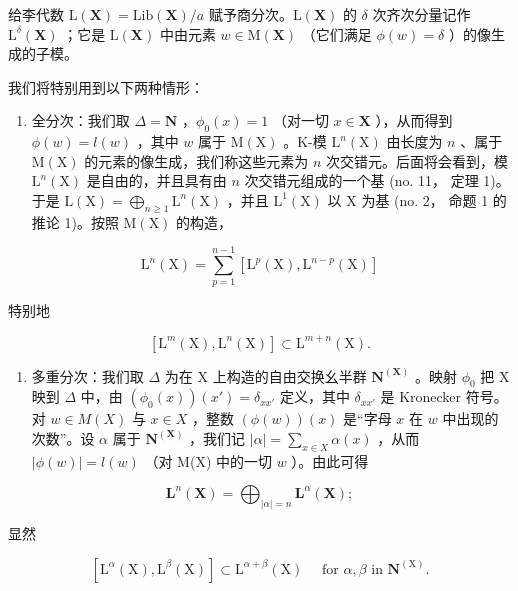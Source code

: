 给李代数 \(\mathrm{L}(\mathbf{X}) = \mathrm{Lib}(\mathbf{X}) / a\) 赋予商分次。\(\mathrm{L}(\mathbf{X})\) 的 \(\delta\) 次齐次分量记作 \(\mathrm{L}^{\delta}(\mathbf{X})\) ；它是 \(\mathrm{L}(\mathbf{X})\) 中由元素 \(w \in \mathrm{M}(\mathbf{X})\) （它们满足 \(\phi(w) = \delta\) ）的像生成的子模。

我们将特别用到以下两种情形：

\begin{enumerate}
\def\labelenumi{(\alph{enumi})}
\tightlist
\item
  全分次：我们取 \(\Delta = \mathbf{N}\) ，\(\phi_0(x) = 1\) （对一切 \(x\in \mathbf{X}\) ），从而得到 \(\phi (w) = l(w)\) ，其中 \(w\) 属于 \(\mathrm{M}(\mathrm{X})\) 。K-模 \(\mathrm{L}^n (\mathrm{X})\) 由长度为 \(n\) 、属于 \(\mathrm{M}(\mathrm{X})\) 的元素的像生成，我们称这些元素为 \(n\) 次交错元。后面将会看到，模 \(\mathrm{L}^n (\mathrm{X})\) 是自由的，并且具有由 \(n\) 次交错元组成的一个基 (no. 11， 定理 1)。于是 \(\mathrm{L}(\mathrm{X}) = \bigoplus_{n\geq 1}\mathrm{L}^n (\mathrm{X})\) ，并且 \(\mathrm{L}^1 (\mathrm{X})\) 以 X 为基 (no. 2， 命题 1 的推论 1)。按照 \(\mathrm{M}(\mathrm{X})\) 的构造，
\end{enumerate}

\[
\mathrm{L} ^ {n} (\mathrm{X}) = \sum_ {p = 1} ^ {n - 1} [ \mathrm{L} ^ {p} (\mathrm{X}), \mathrm{L} ^ {n - p} (\mathrm{X}) ]\tag{12}
\]

特别地

\[
[ \mathrm{L} ^ {m} (\mathrm{X}), \mathrm{L} ^ {n} (\mathrm{X}) ] \subset \mathrm{L} ^ {m + n} (\mathrm{X}).\tag{13}
\]

\begin{enumerate}
\def\labelenumi{(\alph{enumi})}
\setcounter{enumi}{1}
\tightlist
\item
  多重分次：我们取 \(\Delta\) 为在 X 上构造的自由交换幺半群 \(\mathbf{N}^{(\mathbf{X})}\) 。映射 \(\phi_0\) 把 X 映到 \(\Delta\) 中，由 \((\phi_0(x))(x') = \delta_{xx'}\) 定义，其中 \(\delta_{xx'}\) 是 Kronecker 符号。对 \(w \in M(X)\) 与 \(x \in X\) ，整数 \((\phi(w))(x)\) 是“字母 \(x\) 在 \(w\) 中出现的次数”。设 \(\alpha\) 属于 \(\mathbf{N}^{(\mathbf{X})}\) ，我们记 \(|\alpha| = \sum_{x \in X} \alpha(x)\) ，从而 \(|\phi(w)| = l(w)\) （对 M(X) 中的一切 \(w\) ）。由此可得
\end{enumerate}

\[
\mathbf {L} ^ {n} (\mathbf {X}) = \bigoplus_ {| \alpha | = n} \mathbf {L} ^ {\alpha} (\mathbf {X});\tag{14}
\]

显然

\[
[ \mathrm{L} ^ {\alpha} (\mathrm{X}), \mathrm{L} ^ {\beta} (\mathrm{X}) ] \subset \mathrm{L} ^ {\alpha + \beta} (\mathrm{X}) \quad \text { for } \alpha , \beta \text { in } \mathbf {N} ^ {(\mathrm{X})}.\tag{15}
\]

